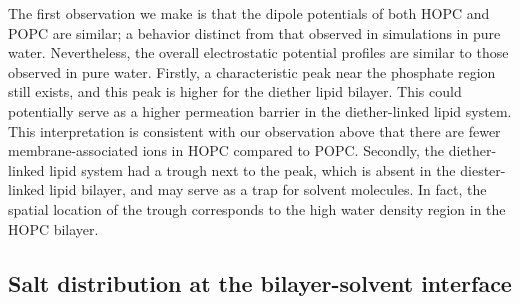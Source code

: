 \documentclass[12pt,preprint,times,openany,draft]{book}
\begin{document}
The first observation we make is that the 
dipole potentials of both HOPC and POPC are similar; a behavior distinct from that 
observed in simulations in pure water. Nevertheless, the overall electrostatic potential 
profiles are similar to those observed in pure water. Firstly, a characteristic peak near the 
phosphate region still exists, and this peak is higher for the diether lipid bilayer. This could potentially 
serve as a higher permeation barrier in the diether-linked lipid system. This interpretation is consistent with our 
observation above that there are fewer membrane-associated ions in HOPC compared to POPC. Secondly, the 
diether-linked lipid system had a trough next to the peak, which is absent in the diester-linked lipid bilayer, and 
may serve as a trap for solvent molecules. In fact, the spatial location of the trough corresponds to the high water density region in the HOPC bilayer.



\subsection{Salt distribution at the bilayer-solvent interface}
\end{document}
